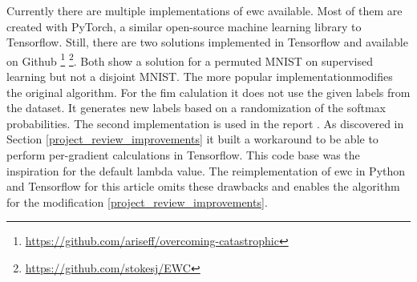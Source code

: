 Currently there are multiple implementations of \acrshort{ewc} available.
Most of them are created with PyTorch, a similar open-source machine learning library to Tensorflow.
Still, there are two solutions implemented in Tensorflow and available on Github
\footnote[1]{\url{https://github.com/ariseff/overcoming-catastrophic}}
\footnote[2]{\url{https://github.com/stokesj/EWC}}.
Both show a solution for a permuted MNIST on supervised learning but not a disjoint MNIST.
The more popular implementation\footnotemark[1] modifies the original algorithm.
For the \acrshort{fim} calulation it does not use the given labels from the dataset.
It generates new labels based on a randomization of the softmax probabilities.
The second implementation \footnotemark[2] is used in the report \cite{cf_application_oriented_study}.
As discovered in Section \ref{project_review_improvements} it built a workaround to be able to perform per-gradient calculations in Tensorflow.
This code base was the inspiration for the default lambda value.
\newline
The reimplementation of \acrshort{ewc} in Python and Tensorflow for this article omits these drawbacks and enables the algorithm for the modification \ref{project_review_improvements}.

